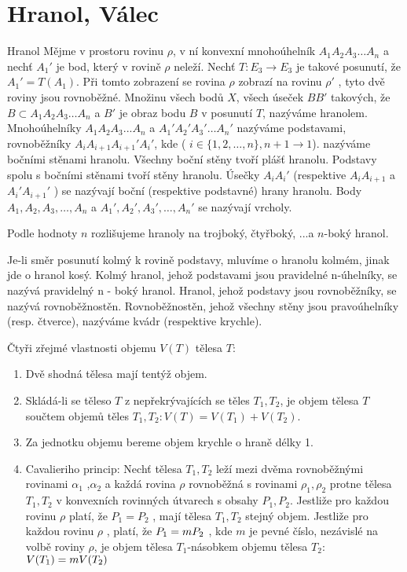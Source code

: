 
\let\braceru=\relax \let\bracelu=\relax 
\def\o#1{\setbox0=
	\hbox{$\kern2pt\overbrace{\kern-2pt#1\kern-2pt}\kern2pt$}\ht0=2.1ex\box0}
\def\to#1{\hbox{#1\rlap{\t{}}}}
\def\rad{\rm{rad}}
\def\f{\frac}
\section{Hranol, Válec}
\Def
Hranol
Mějme v prostoru rovinu $\rho$, v ní konvexní
mnohoúhelník $A_1 A_2 A_3 \dots A_n$ a nechť $A_1'$ je bod,
který v rovině $\rho$ neleží. Nechť $T : E_3 \rightarrow E_3$ je
takové posunutí, že $A_1' =T(A_1 )$. Při tomto
zobrazení se rovina $\rho$ zobrazí na rovinu $\rho'$ ,
tyto dvě roviny jsou rovnoběžné. Množinu
všech bodů $X$, všech úseček $BB'$ takových, že
$B \subset A_1 A_2 A_3 \dots A_n$ a $B'$ je obraz bodu $B$ v posunutí
$T$, nazýváme hranolem.
Mnohoúhelníky $A_1 A_2 A_3 ... A_n$ a $A_1' A_2' A_3' \dots A_n'$
nazýváme podstavami, rovnoběžníky $A_i A_{i+1}  A_{i+1}' A_i'$, kde ( $i \in \{ 1 , 2 ,\dots, n \}, n+1 \rightarrow 1 $).
nazýváme bočními stěnami hranolu. Všechny boční stěny tvoří plášť hranolu. Podstavy
spolu s bočními stěnami tvoří stěny hranolu. Úsečky $A_i A_i'$ (respektive $A_i A_{i+1}$ a $A_i'A_{i+1}'$ ) se nazývají
boční (respektive podstavné) hrany hranolu. Body $A_1 , A_2 , A_3 ,\dots, A_n$ a $A_1' , A_2' , A_3' ,\dots, A_n'$
se nazývají vrcholy.

\Poz
Podle hodnoty $n$ rozlišujeme hranoly na trojboký, čtyřboký, ...a $n$-boký hranol.

\Def
Je-li směr posunutí kolmý k rovině podstavy, mluvíme o hranolu kolmém, jinak jde o
hranol kosý. Kolmý hranol, jehož podstavami jsou pravidelné n-úhelníky, se nazývá
pravidelný
n - boký hranol. Hranol, jehož podstavy jsou rovnoběžníky, se nazývá rovnoběžnostěn.
Rovnoběžnostěn, jehož všechny stěny jsou pravoúhelníky (resp. čtverce), nazýváme kvádr
(respektive krychle).

\Poz
Čtyři zřejmé vlastnosti objemu $V(T)$ tělesa $T$:
\begin{enumerate}
	\item Dvě shodná tělesa mají tentýž objem.
	\item Skládá-li se těleso $T$ z nepřekrývajících se těles $T_1 ,T_2$, je objem tělesa $T$ součtem objemů
těles $T_1 ,T_2 : V(T)=V(T_1 )+V(T_2 )$.
\item Za jednotku objemu bereme objem krychle o hraně délky 1.
\item Cavalieriho princip:
Nechť tělesa $T_1 ,T_2$ leží mezi dvěma rovnoběžnými rovinami $\alpha_1$ ,$\alpha_2$ a každá rovina $\rho$
rovnoběžná s rovinami $\rho_1 , \rho_2$ protne tělesa $T_1 ,T_2$ v konvexních rovinných útvarech
s obsahy $P_1 , P_2$. Jestliže pro každou rovinu $\rho$ platí, že $P_1 = P_2$ , mají tělesa $T_1 ,T_2$ stejný
objem.
Jestliže pro každou rovinu $\rho$ , platí, že $P_1 = m\*P_2$ , kde $m$ je pevné číslo, nezávislé na
volbě roviny $\rho$, je objem tělesa $T_1$-násobkem objemu tělesa $T_2$: $V ( T_1 ) = m \* V ( T_2 )$
\end{enumerate}

